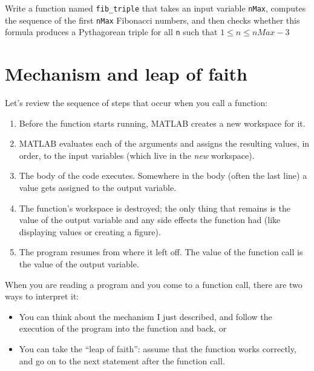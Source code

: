 \documentclass[
]{book}
\begin{document}
\begin{ex}
Write a function named {\tt fib\_triple} that
takes an input variable {\tt nMax}, computes the sequence of 
the first {\tt nMax} Fibonacci numbers, and then checks whether
this formula produces a Pythagorean triple for all {\tt n} such that 
$ 1 \leq n \leq nMax-3 $
\end{ex}



\section{Mechanism and leap of faith}

Let's review the sequence of steps that occur when you call
a function:

\begin{enumerate}

\item Before the function starts running, MATLAB creates a new
workspace for it.

\item MATLAB evaluates each of the arguments and assigns
the resulting values, in order, to the input variables (which
live in the {\em new} workspace).

\item The body of the code executes.  Somewhere in the body
(often the last line) a value gets assigned to the output variable.

\item The function's workspace is destroyed; the only thing
that remains is the value of the output variable and any side
effects the function had (like displaying values or creating
a figure).

\item The program resumes from where it left off.  The value
of the function call is the value of the output variable.

\end{enumerate}

When you are reading a program and you come to a function call,
there are two ways to interpret it:

\begin{itemize}

\item You can think about the mechanism I just described,
and follow the execution of the program into the function and back, or

\item You can take the ``leap of faith'': assume that the function
works correctly, and go on to the next statement after the
function call.

\end{itemize}
\end{document}
